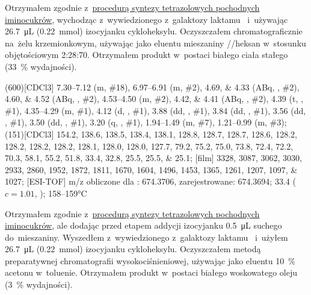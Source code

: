 Otrzymałem zgodnie z~\hyperref[experimental:sugars:schwartz]{procedurą syntezy tetrazolowych
  pochodnych iminocukrów}, wychodząc z~wywiedzionego z~galaktozy laktamu~
  i~używając \SI{26.7}{\micro\liter} (\SI{0.22}{\milli\mol}) izocyjanku cykloheksylu.
Oczyszczałem chromatograficznie na~żelu krzemionkowym,
  używając jako eluentu mieszaniny //heksan w~stosunku objętościowym
  \num{2}:\num{28}:\num{70}.
Otrzymałem produkt w~postaci białego ciała stałego (\SI{33}{\percent} wydajności).

\begin{fullexp}
  \NMR(600)[CDCl3] \numrange{7.30}{7.12} (m, \#{18}), \numrange{6.97}{6.91} (m, \#{2}), \numlist{4.69;4.33} (ABq, , \#{2}), \numlist{4.60;4.52} (ABq, , \#{2}), \numrange{4.53}{4.50} (m, \#{2}), \numlist{4.42;4.41} (ABq, , \#{2}), \num{4.39} (t, , \#{1}), \numrange{4.35}{4.29} (m, \#{1}), \num{4.12} (d, , \#{1}), \num{3.88} (dd, , \#{1}), \num{3.84} (dd, , \#{1}), \num{3.56} (dd, , \#{1}), \num{3.50} (dd, , \#{1}), \num{3.20} (q, , \#{1}), \numrange{1.94}{1.49} (m, \#{7}), \numrange{1.21}{0.99} (m, \#{3});
  (151)[CDCl3] \numlist{154.2; 138.6; 138.5; 138.4; 138.1; 128.8; 128.7; 128.7; 128.6; 128.2; 128.2; 128.2; 128.2; 128.1; 128.0; 128.0; 127.7; 79.2; 75.2; 75.0; 73.8; 72.4; 72.2; 70.3; 58.1; 55.2; 51.8; 33.4; 32.8; 25.5; 25.5; 25.1};
  [film] \numlist{3328; 3087; 3062; 3030; 2933; 2860; 1952; 1872; 1811; 1670; 1604; 1496; 1453; 1365; 1261; 1207; 1097; 1027};
  [ESI-TOF] m/z obliczone dla : \num{674.3706}, zarejestrowane: \num{674.3694};
  \data{[$\alpha^{23}_D$]~$=$} \num{33.4} ($c = 1.01$, );
   \numrange{158}{159}\si{\celsius}
\end{fullexp}

Otrzymałem zgodnie z~\hyperref[experimental:sugars:schwartz]{procedurą syntezy tetrazolowych
  pochodnych iminocukrów}, ale dodając przed etapem addycji izocyjanku
  \SI{0.5}{\micro\liter} suchego  do~mieszaniny.
Wyszedłem z~wywiedzionego z~galaktozy laktamu~
  i~użyłem \SI{26.7}{\micro\liter} (\SI{0.22}{\milli\mol}) izocyjanku cykloheksylu.
Oczyszczałem metodą preparatywnej chromatografii wysokociśnieniowej,
  używając jako eluentu \SI{10}{\percent} acetonu w~toluenie.
Otrzymałem produkt w~postaci białego woskowatego oleju (\SI{3}{\percent} wydajności).

